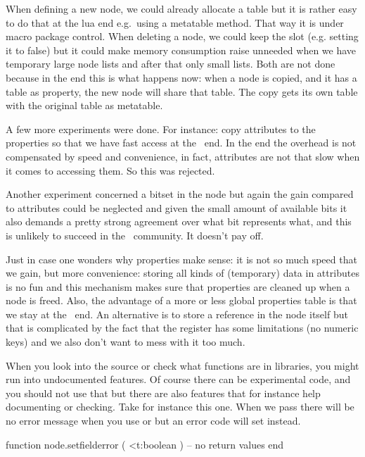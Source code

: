 When defining a new node, we could already allocate a table but it is rather easy
to do that at the lua end e.g.\ using a metatable  method. That
way it is under macro package control. When deleting a node, we could keep the
slot (e.g. setting it to false) but it could make memory consumption raise
unneeded when we have temporary large node lists and after that only small lists.
Both are not done because in the end this is what happens now: when a node is
copied, and it has a table as property, the new node will share that table. The
copy gets its own table with the original table as metatable.

A few more experiments were done. For instance: copy attributes to the properties
so that we have fast access at the \LUA\ end. In the end the overhead is not
compensated by speed and convenience, in fact, attributes are not that slow when
it comes to accessing them. So this was rejected.

Another experiment concerned a bitset in the node but again the gain compared to
attributes could be neglected and given the small amount of available bits it also
demands a pretty strong agreement over what bit represents what, and this is
unlikely to succeed in the \TEX\ community. It doesn't pay off.

Just in case one wonders why properties make sense: it is not so much speed that
we gain, but more convenience: storing all kinds of (temporary) data in attributes
is no fun and this mechanism makes sure that properties are cleaned up when a
node is freed. Also, the advantage of a more or less global properties table is
that we stay at the \LUA\ end. An alternative is to store a reference in the node
itself but that is complicated by the fact that the register has some limitations
(no numeric keys) and we also don't want to mess with it too much.

\stopsubsection

\startsubsection[title=Private]

When you look into the source or check what functions are in libraries, you might
run into undocumented features. Of course there can be experimental code, and you
should not use that but there are also features that for instance help documenting
or checking. Take for instance this one. When we pass  there will be
no error message when you use  or  but an error
code will set instead.

\starttyping[option=LUA]
function node.setfielderror ( <t:boolean )
    -- no return values
end
\stoptyping

